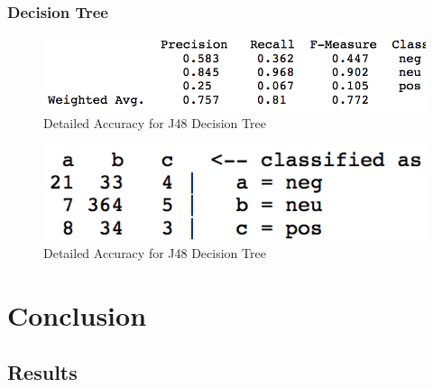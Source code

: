 \documentclass{beamer}
\begin{document}

\begin{frame}[fragile] %
\frametitle{Decision Tree}

\begin{figure}[h]
\centering
\includegraphics[scale=0.4]{img/DTree-Accuracy.png}
\caption{Detailed Accuracy for J48 Decision Tree}
\label{fig:DT-Acc}
\end{figure}

\begin{figure}[h]
\centering
\includegraphics[scale=0.4]{img/DTree-Confusion.png}
\caption{Detailed Accuracy for J48 Decision Tree}
\label{fig:DT-Acc}
\end{figure}

\end{frame}

\section{Conclusion}
\subsection{Results}
\end{document}
